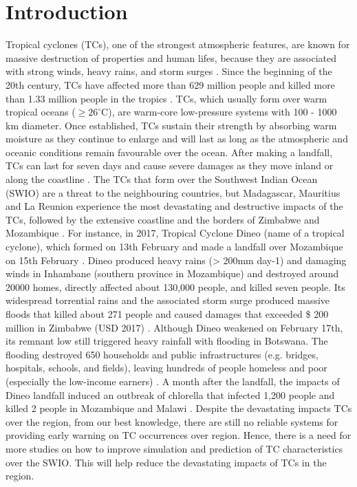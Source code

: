 \documentclass[9pt,a4paper]{article}
\begin{document}
	\section{Introduction}
	Tropical cyclones (TCs), one of the strongest atmospheric features, are known for massive destruction of properties and human lifes, because they are associated with strong winds, heavy rains, and storm surges \citep{TROPICAL}. Since the beginning of the 20th century, TCs have affected more than 629 million people and killed more than 1.33 million people in the tropics \citep{doocy2013human}. TCs, which usually form over warm tropical oceans ($\geq 26^{\circ}$C), are warm-core low-pressure systems with 100 - 1000 km diameter. Once established, TCs sustain their strength by absorbing warm moisture as they continue to enlarge and will last as long as the atmospheric and oceanic conditions remain favourable over the ocean. After making a landfall, TCs can last for seven days and cause severe damages as they move inland or along the coastline \citep{doocy2013human}. The TCs that form over the Southwest Indian Ocean (SWIO) are a threat to the neighbouring countries, but Madagascar, Mauritius and La Reunion experience the most devastating and destructive impacts of the TCs, followed by the extensive coastline and the borders of Zimbabwe and Mozambique \citep{Tropic}. For instance, in 2017, Tropical Cyclone Dineo (name of a tropical cyclone), which formed on 13th February and made a landfall over Mozambique on 15th February \citep{moses}. Dineo produced heavy rains (> 200mm  day-1) and damaging winds in Inhambane (southern province in Mozambique) and destroyed around 20000 homes, directly affected about  130,000 people, and killed seven people. Its widespread torrential rains and the associated storm surge produced massive floods that killed about 271 people and caused damages that exceeded \$ 200 million in Zimbabwe (USD 2017) \citep{Cyclone}. Although Dineo weakened on February 17th, its remnant low still triggered heavy rainfall with flooding in Botswana. The flooding destroyed 650 households and public infrastructures (e.g. bridges, hospitals, schools, and fields), leaving hundreds of people homeless and poor (especially the low-income earners) \citep{moses}. A month after the landfall, the impacts of Dineo landfall induced an outbreak of chlorella that infected 1,200 people and killed 2 people in Mozambique and Malawi \citep{Cyclone}. Despite the devastating impacts TCs over the region, from our best knowledge, there are still no reliable systems for providing early warning on TC occurrences over region. Hence, there is a need for more studies on how to improve simulation and prediction of TC characteristics over the SWIO. This will help reduce the devastating impacts of TCs in the region.
	
\end{document}
